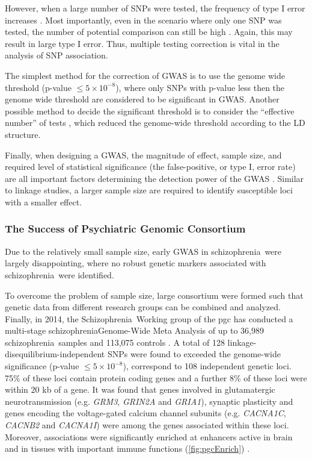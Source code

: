 \documentclass[12pt]{scrbook}
\newcommand*{\scz}{schizophrenia}
\newcommand*{\Scz}{Schizophrenia}
\begin{document}
However, when a large number of \glspl{SNP} were tested, the frequency of type I error increases \citep{Peters2010}.
Most importantly, even in the scenario where only one \gls{SNP} was tested, the number of potential comparison can still be high \citep{gelman2016statistical}.
Again, this may result in large type I error.   
Thus, multiple testing correction is vital in the analysis of \gls{SNP} association.

The simplest method for the correction of \gls{GWAS} is to use the genome wide threshold (p-value $\le5\times10^{-8}$), where only \glspl{SNP} with p-value less then the genome wide threshold are considered to be significant in \gls{GWAS}.
Another possible method to decide the significant threshold is to consider the ``effective number'' of tests \citep{Li2011}, which reduced the genome-wide threshold according to the \gls{LD} structure.

Finally, when designing a \gls{GWAS}, the magnitude of effect, sample size, and required level of statistical significance (the false-positive, or type I, error rate) are all important factors determining the detection power of the \gls{GWAS} \citep{Purcell2003}.
Similar to linkage studies, a larger sample size are required to identify susceptible loci with a smaller effect. 

\subsubsection{The Success of Psychiatric Genomic Consortium} 
Due to the relatively small sample size, early \gls{GWAS} in \scz\ were largely disappointing, where no robust genetic markers associated with \scz\ were identified. 

To overcome the problem of sample size, large consortium were formed such that genetic data from different research groups can be combined and analyzed.
Finally, in 2014, the \Scz\ Working group of the \gls{pgc} has conducted a multi-stage \scz Genome-Wide Meta Analysis of up to 36,989 \scz\ samples and 113,075 controls \citep{Ripke2014}.
A total of 128 linkage-disequilibrium-independent \glspl{SNP} were found to exceeded the genome-wide significance (p-value $\le 5\times10^{-8}$), correspond to 108 independent genetic loci.
75\% of these loci contain protein coding genes and a further 8\% of these loci were within 20 \gls{kb} of a gene. 
It was found that genes involved in glutamatergic neurotransmission (e.g. \textit{GRM3}, \textit{GRIN2A} and \textit{GRIA1}), synaptic plasticity and genes encoding the voltage-gated calcium channel subunits (e.g. \textit{CACNA1C}, \textit{CACNB2} and \textit{CACNA1I}) were among the genes associated within these loci.
Moreover, associations were significantly enriched at enhancers active in brain and in tissues with important immune functions (\cref{fig:pgcEnrich}) \citep{Ripke2014}.
\end{document}
